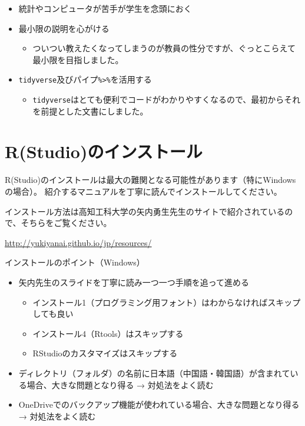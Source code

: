 \documentclass[
]{book}
\providecommand{\tightlist}{%
  \setlength{\itemsep}{0pt}\setlength{\parskip}{0pt}}
\begin{document}
\begin{itemize}
\tightlist
\item
  統計やコンピュータが苦手が学生を念頭におく
\item
  最小限の説明を心がける

  \begin{itemize}
  \tightlist
  \item
    ついつい教えたくなってしまうのが教員の性分ですが、ぐっとこらえて最小限を目指しました。
  \end{itemize}
\item
  \texttt{tidyverse}及びパイプ\texttt{\%\textgreater{}\%}を活用する

  \begin{itemize}
  \tightlist
  \item
    \texttt{tidyverse}はとても便利でコードがわかりやすくなるので、最初からそれを前提とした文書にしました。
  \end{itemize}
\end{itemize}

\hypertarget{InstallR}{%
\chapter{R(Studio)のインストール}\label{InstallR}}

R(Studio)のインストールは最大の難関となる可能性があります（特にWindowsの場合）。
紹介するマニュアルを丁寧に読んでインストールしてください。

インストール方法は高知工科大学の矢内勇生先生のサイトで紹介されているので、そちらをご覧ください。

\url{http://yukiyanai.github.io/jp/resources/}

インストールのポイント（Windows）

\begin{itemize}
\tightlist
\item
  矢内先生のスライドを丁寧に読み一つ一つ手順を追って進める

  \begin{itemize}
  \tightlist
  \item
    インストール1（プログラミング用フォント）はわからなければスキップしても良い
  \item
    インストール4（Rtools）はスキップする
  \item
    RStudioのカスタマイズはスキップする
  \end{itemize}
\item
  ディレクトリ（フォルダ）の名前に日本語（中国語・韓国語）が含まれている場合、大きな問題となり得る → 対処法をよく読む
\item
  OneDriveでのバックアップ機能が使われている場合、大きな問題となり得る → 対処法をよく読む
\end{itemize}
\end{document}
